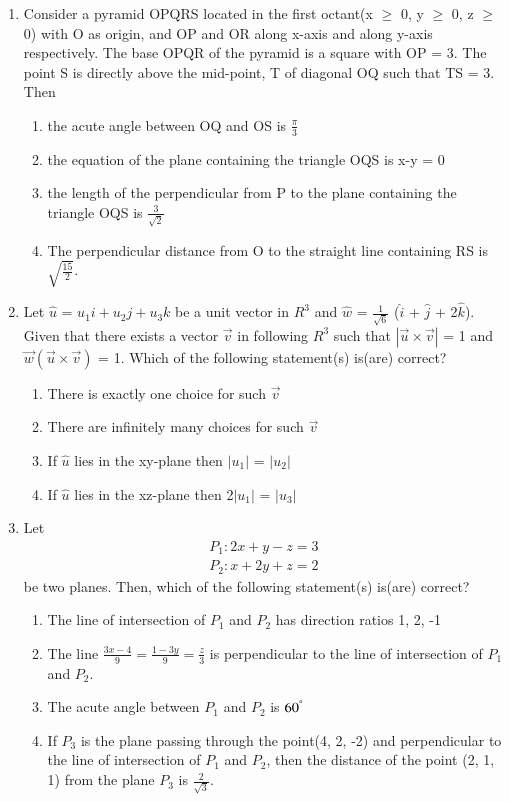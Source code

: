 \begin{enumerate}[label=\arabic*.,ref=\thesubsection.\theenumi]
\item Consider a pyramid OPQRS located in the first octant(x $\geq$ 0, y $\geq$ 0, z $\geq$ 0) with O as origin, and OP and OR along x-axis and along y-axis respectively. The base OPQR of the pyramid is a square with OP = 3. The point S is directly above the mid-point, T of diagonal OQ such that TS = 3. Then
\begin{enumerate}
\item the acute angle between OQ and OS is $\frac{\pi}{3}$
\item the equation of the plane containing the triangle OQS is x-y = 0
\item the length of the perpendicular from P to the plane containing the triangle OQS is $\frac{3}{\sqrt{2}}$
\item The perpendicular distance from O to the straight line containing RS is $\sqrt{\frac{15}{2}}$.
\end{enumerate}

\item Let $\hat{u}$ = $u_{1}i + u_{2}j + u_{3}k$ be a unit vector in $R^{3}$ and $\hat{w}$ = $\frac{1}{\sqrt{6}}$
($\hat{i}$ + $\hat{j}$ + 2$\hat{k}$). Given that there exists a vector $\overrightarrow{v}$ in following $R^{3}$ such that $|\overrightarrow{u} \times \overrightarrow{v}|$ = 1 and $\overrightarrow{w}(\overrightarrow{u} \times \overrightarrow{v})$ = 1. Which of the following statement(s) is(are) correct?
\begin{enumerate}
\item There is exactly one choice for such $\overrightarrow{v}$
\item There are infinitely many choices for such $\overrightarrow{v}$
\item If $\hat{u}$ lies in the xy-plane then $|u_1|$ = $|u_2|$
\item If $\hat{u}$ lies in the xz-plane then 2$|u_1|$ = $|u_3|$
\end{enumerate}

\item Let 
\begin{align*}
P_1: 2x + y - z = 3
\end{align*}
\begin{align*}
P_2: x + 2y + z = 2
\end{align*}
be two planes. Then, which of the following statement(s) is(are) correct?
\begin{enumerate}
\item The line of intersection of $P_1$ and $P_2$ has direction ratios 1, 2, -1
\item The line $\frac{3x - 4}{9} = \frac{1 - 3y}{9} = \frac{z}{3}$ is perpendicular to the line of intersection of $P_1$ and $P_2$.
\item The acute angle between $P_1$ and $P_2$ is $60^{\degree}$
\item If $P_3$ is the plane passing through the point(4, 2, -2) and perpendicular to the line of intersection of $P_1$ and $P_2$, then the distance of the point (2, 1, 1) from the plane $P_3$ is $\frac{2}{\sqrt{3}}$.
\end{enumerate}


\end{enumerate}
